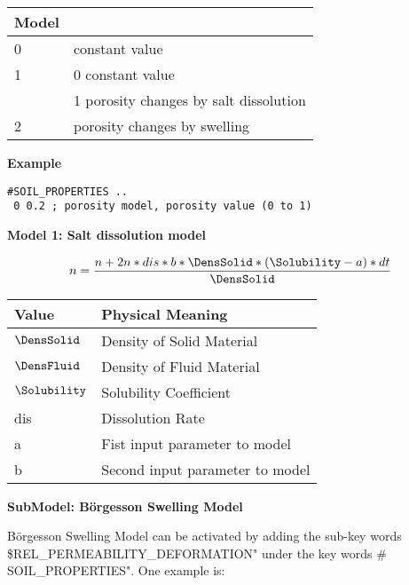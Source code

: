 \vspace{0.5cm}
\begin{center}
\begin{tabular}{l|l}
Model & \\
\hline
%
0 & constant value \\
%
1 & 0 constant value  \\
  & 1 porosity changes by salt dissolution  \\
%
2 & porosity changes by swelling\\
\end{tabular}
\end{center}
\vspace{0.5cm}
\textbf{Example}
\begin{verbatim}
#SOIL_PROPERTIES ..
 0 0.2 ; porosity model, porosity value (0 to 1)
\end{verbatim}

\textbf{Model 1:   Salt dissolution model}

\vspace{0.5cm}

\begin{eqnarray}
n=\frac{n+2n*dis*b*{\DensSolid}*({\Solubility}-a)*dt}{\DensSolid}
\end{eqnarray}

\begin{tabular}{l|l}
Value & Physical Meaning\\
\hline
%
$\DensSolid$ & Density of Solid Material \\
$\DensFluid$ & Density of Fluid Material  \\
$\Solubility$ & Solubility Coefficient  \\
dis & Dissolution Rate \\
a & Fist input parameter to model \\
b & Second input parameter to model \\
\end{tabular}

\vspace{0.5cm}

\textbf{SubModel:   B\"{o}rgesson Swelling Model}

\vspace{0.5cm}

B\"{o}rgesson Swelling Model can be activated by adding the sub-key
words \\ \$REL\_PERMEABILITY\_DEFORMATION" under the key words \#
SOIL\_PROPERTIES". One example is:

\footnotesize

